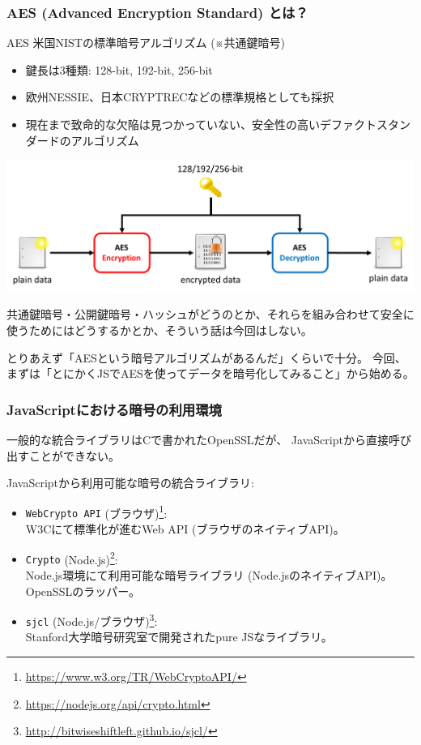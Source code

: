 \documentclass[12pt,dvipdfmx]{beamer}
\begin{document}
\begin{frame}
\frametitle{AES (Advanced Encryption Standard) とは？}
\begin{block}{AES}
米国NISTの標準暗号アルゴリズム (※共通鍵暗号)\\
\begin{itemize}
 \item 鍵長は3種類: 128-bit, 192-bit, 256-bit
 \item 欧州NESSIE、日本CRYPTRECなどの標準規格としても採択
 \item 現在まで致命的な欠陥は見つかっていない、安全性の高い\alert{デファクトスタンダード}のアルゴリズム
\end{itemize}
\end{block}
\begin{center}
\includegraphics[width=0.9\linewidth]{Figs/aes_flow.pdf}
\end{center}
\end{frame}

\begin{frame}
共通鍵暗号・公開鍵暗号・ハッシュがどうのとか、それらを組み合わせて安全に使うためにはどうするかとか、そういう話は今回はしない。

\vspace{1ex}

とりあえず「AESという暗号アルゴリズムがあるんだ」くらいで十分。
今回、まずは「\alert{とにかくJSでAESを使ってデータを暗号化してみること}」から始める。
\end{frame}


\begin{frame}
\frametitle{JavaScriptにおける暗号の利用環境}
\small
一般的な統合ライブラリはCで書かれたOpenSSLだが、
JavaScriptから直接呼び出すことができない。

\vspace{1ex}

JavaScriptから利用可能な暗号の統合ライブラリ:
\begin{itemize}
\item \alert{\texttt{WebCrypto API}} (ブラウザ)\footnote[frame]{\url{https://www.w3.org/TR/WebCryptoAPI/}}:\\
W3Cにて標準化が進むWeb API (ブラウザのネイティブAPI)。
\item \alert{\texttt{Crypto}} (Node.js)\footnote[frame]{\url{https://nodejs.org/api/crypto.html}}:\\
Node.js環境にて利用可能な暗号ライブラリ (Node.jsのネイティブAPI)。OpenSSLのラッパー。
\item \texttt{sjcl} (Node.js/ブラウザ)\footnote[frame]{\url{http://bitwiseshiftleft.github.io/sjcl/}}:\\
Stanford大学暗号研究室で開発されたpure JSなライブラリ。
\end{itemize}
\end{frame}
\end{document}
